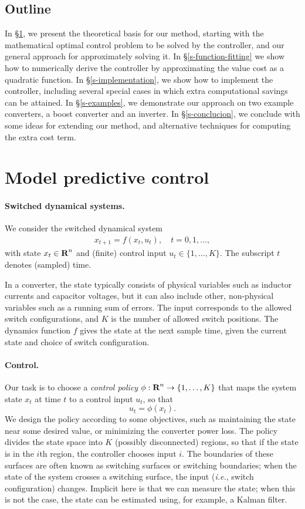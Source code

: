 \documentclass[12pt]{article}
\newcommand{\ie}{{\it i.e.}}
\newcommand{\reals}{{\mbox{\bf R}}}
\begin{document}
\subsection{Outline}
In \S\ref{s-mpc}, we present the theoretical basis for our method,
starting with the mathematical optimal control problem
to be solved by the controller,
and our general approach for approximately solving it.
In \S\ref{s-function-fitting}
we show how to numerically derive the controller
by approximating the value cost as a quadratic function.
In \S\ref{s-implementation}, we show how to implement the controller,
including several special cases in which extra computational savings can be attained.
In \S\ref{s-examples}, we demonstrate our approach on 
two example converters, a boost converter and an inverter.
In \S\ref{s-conclucion}, we conclude with some ideas for extending our method,
and alternative techniques for computing the extra cost term.


\section{Model predictive control}
\label{s-mpc}

\paragraph{Switched dynamical systems.}
We consider the switched dynamical system
\begin{align}
\label{e-sw-sys}
x_{t+1} = f(x_t, u_t),
\quad
t = 0, 1, \dots,
\end{align}
with state $x_t \in \reals^n$ and 
(finite) control input $u_t \in \{1, \dots, K\}$.
The subscript $t$ denotes (sampled) time.

In a converter, the state typically consists of physical variables 
such as inductor currents and capacitor voltages, 
but it can also include other, non-physical variables such as
a running sum of errors.
The input corresponds to the allowed switch configurations, and $K$ is
the number of allowed switch positions.
The dynamics function $f$ gives the state at the next sample time,
given the current state and choice of switch configuration.

\paragraph{Control.}
Our task is to choose a \emph{control policy} 
$\phi:\reals^n \to  \{1, \dots, K\}$
that maps the system state $x_t$ at time $t$ to a control input $u_t$, so that
\[
u_t = \phi(x_t).
\]
We design the policy according to some objectives, 
such as maintaining the state near some desired value,
or minimizing the converter power loss.
The policy divides the state space into $K$ 
(possibly disconnected) regions,
so that if the state is in the $i$th region,
the controller chooses input $i$.
The boundaries of these surfaces are often known as switching surfaces
or switching boundaries;
when the state of the system crosses a switching surface, the 
input (\ie, switch configuration) changes.
Implicit here is that we can measure the state; when this is not the case,
the state can be estimated using, for example, a Kalman filter.
\end{document}
